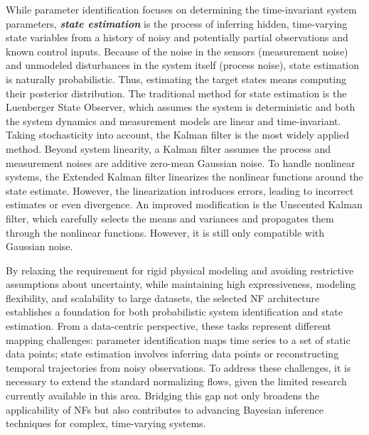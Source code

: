While parameter identification focuses on determining the time-invariant system parameters, {\bfseries\itshape state estimation} is the process of inferring hidden, time-varying state variables from a history of noisy and potentially partial observations and known control inputs. Because of the noise in the sensors (measurement noise) and unmodeled disturbances in the system itself (process noise), state estimation is naturally probabilistic. Thus, estimating the target states means computing their posterior distribution. The traditional method for state estimation is the Luenberger State Observer, which assumes the system is deterministic and both the system dynamics and measurement models are linear and time-invariant. Taking stochasticity into account, the Kalman filter is the most widely applied method. Beyond system linearity, a Kalman filter assumes the process and measurement noises are additive zero-mean Gaussian noise. To handle nonlinear systems, the Extended Kalman filter linearizes the nonlinear functions around the state estimate. However, the linearization introduces errors, leading to incorrect estimates or even divergence. An improved modification is the Unscented Kalman filter, which carefully selects the means and variances and propagates them through the nonlinear functions. However, it is still only compatible with Gaussian noise.

By relaxing the requirement for rigid physical modeling and avoiding restrictive assumptions about uncertainty, while maintaining high expressiveness, modeling flexibility, and scalability to large datasets, the selected \ac{NF} architecture establishes a foundation for both probabilistic system identification and state estimation. From a data-centric perspective, these tasks represent different mapping challenges: parameter identification maps time series to a set of static data points; state estimation involves inferring data points or reconstructing temporal trajectories from noisy observations. To address these challenges, it is necessary to extend the standard normalizing flows, given the limited research currently available in this area. Bridging this gap not only broadens the applicability of \acp{NF} but also contributes to advancing Bayesian inference techniques for complex, time-varying systems.

